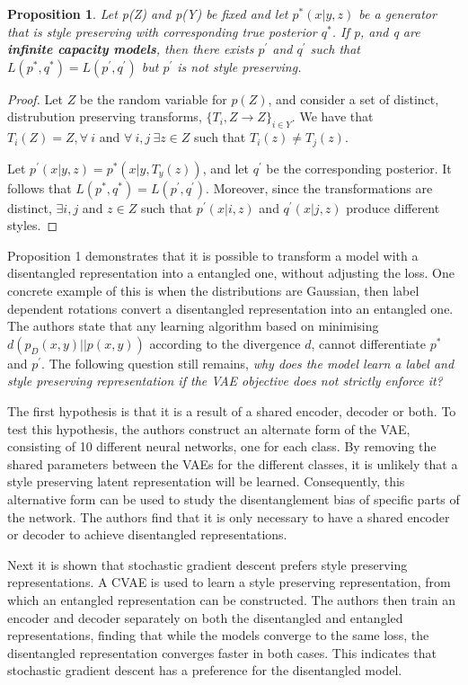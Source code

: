 \documentclass[11pt, a4paper]{article}
\newtheorem{proposition}{Proposition}
\begin{document}
\begin{proposition}
	Let p(Z) and p(Y) be fixed and let $p^{*}(x|y,z)$ be a generator that is style preserving with corresponding true posterior $q^{*}$. If p, and q are \textbf{infinite capacity models}, then there exists $p^{'}$ and $q^{'}$ such that $L(p^{*}, q^{*}) = L(p^{'}, q^{'})$ but $p^{'}$ is not style preserving.
\end{proposition}
\begin{proof}
	Let $Z$ be the random variable for $p(Z)$, and consider a set of distinct, distrubution preserving transforms, $\{T_i, Z \rightarrow Z \}_{i \in Y}$. We have that $T_i(Z) = Z, \forall\ i$ and $\forall\ i, j\ \exists z \in Z$ such that $T_i(z) \neq T_j(z)$.
	
	Let $p^{'}(x|y,z) = p^{*}(x|y, T_y(z))$, and let $q^{'}$ be the corresponding posterior. It follows that $L(p^{*}, q^{*}) = L(p^{'}, q^{'})$. Moreover, since the transformations are distinct, $\exists i,j$ and $z \in Z$ such that $p^{'}(x|i,z)$ and $q^{'}(x|j,z)$ produce different styles.
\end{proof}

Proposition 1 demonstrates that it is possible to transform a model with a disentangled representation into a entangled one, without adjusting the loss. One concrete example of this is when the distributions are Gaussian, then label dependent rotations convert a disentangled representation into an entangled one. The authors state that any learning algorithm based on minimising $d(p_D(x,y)||p(x,y))$ according to the divergence $d$, cannot differentiate $p^*$ and $p^{'}$. The following question still remains, \textit{why does the model learn a label and style preserving representation if the VAE objective does not strictly enforce it?}

The first hypothesis is that it is a result of a shared encoder, decoder or both. To test this hypothesis, the authors construct an alternate form of the VAE, consisting of 10 different neural networks, one for each class. By removing the shared parameters between the VAEs for the different classes, it is unlikely that a style preserving latent representation will be learned. Consequently, this alternative form can be used to study the disentanglement bias of specific parts of the network. The authors find that it is only necessary to have a shared encoder or decoder to achieve disentangled representations.

Next it is shown that stochastic gradient descent prefers style preserving representations. A CVAE is used to learn a style preserving representation, from which an entangled representation can be constructed. The authors then train an encoder and decoder separately on both the disentangled and entangled representations, finding that while the models converge to the same loss, the disentangled representation converges faster in both cases. This indicates that stochastic gradient descent has a preference for the disentangled model.
\end{document}
